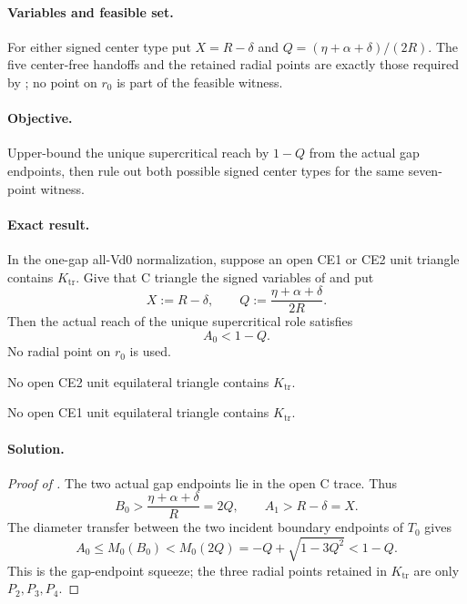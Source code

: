 \paragraph{Variables and feasible set.}
For either signed center type put
$X=R-\delta$ and $Q=(\eta+\alpha+\delta)/(2R)$.  The five center-free
handoffs and the retained radial points are exactly those required by
; no point on $r_0$ is
part of the feasible witness.

\paragraph{Objective.}
Upper-bound the unique supercritical reach by $1-Q$ from the actual gap
endpoints, then rule out both possible signed center types for the same
seven-point witness.

\paragraph{Exact result.}

\begin{lemma}
\label{lem:app-transverse-upper-squeeze}
In the one-gap all-Vd0 normalization, suppose an open CE1 or CE2 unit
triangle contains $K_{\mathrm{tr}}$.  Give that C triangle the signed
variables of  and put
\[
 X:=R-\delta,
 \qquad Q:=\frac{\eta+\alpha+\delta}{2R}.
\]
Then the actual reach of the unique supercritical role satisfies
\[
 A_0<1-Q.
\]
No radial point on $r_0$ is used.
\end{lemma}

\begin{lemma}
\label{lem:app-ce2-transverse-terminal}
No open CE2 unit equilateral triangle contains $K_{\mathrm{tr}}$.
\end{lemma}

\begin{lemma}
\label{lem:app-ce1-transverse-terminal}
No open CE1 unit equilateral triangle contains $K_{\mathrm{tr}}$.
\end{lemma}

\paragraph{Solution.}

\begin{proof}[Proof of ]
The two actual gap endpoints lie in the open C trace.  Thus
\[
 B_0>\frac{\eta+\alpha+\delta}{R}=2Q,
 \qquad A_1>R-\delta=X.
\]
The diameter transfer  between the two
incident boundary endpoints of $T_0$ gives
\[
 A_0\le M_0(B_0)<M_0(2Q)
 =-Q+\sqrt{1-3Q^2}<1-Q.
\]
This is the gap-endpoint squeeze; the three radial points retained in
$K_{\mathrm{tr}}$ are only $P_2,P_3,P_4$.
\end{proof}

